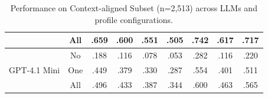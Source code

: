 \begin{table}[t]
\begin{tabular}{lcccccccc}
 & \cellcolor{darkgreen}All & \cellcolor{darkgreen}.659 & \cellcolor{darkgreen}.600 & \cellcolor{darkgreen}.551 & \cellcolor{darkgreen}.505 & \cellcolor{darkgreen}.742 & \cellcolor{darkgreen}.617 & \cellcolor{darkgreen}.717 \\ 
\midrule
\multirow{3}{*}{GPT-4.1 Mini} & No & .188 & .116 & .078 & .053 & .282 & .116 & .220 \\ 
 & \cellcolor{lightgreen}One & \cellcolor{lightgreen}.449 & \cellcolor{lightgreen}.379 & \cellcolor{lightgreen}.330 & \cellcolor{lightgreen}.287 & \cellcolor{lightgreen}.554 & \cellcolor{lightgreen}.401 & \cellcolor{lightgreen}.511 \\ 
 & \cellcolor{darkgreen}All & \cellcolor{darkgreen}.496 & \cellcolor{darkgreen}.433 & \cellcolor{darkgreen}.387 & \cellcolor{darkgreen}.344 & \cellcolor{darkgreen}.600 & \cellcolor{darkgreen}.463 & \cellcolor{darkgreen}.565 \\ 
\bottomrule
\end{tabular}
\caption{Performance on {\dataset} Context-aligned Subset (n=2,513) across LLMs and profile configurations. 
}
\label{tab:main-result-easy}
\vspace{-1pc}
\end{table}